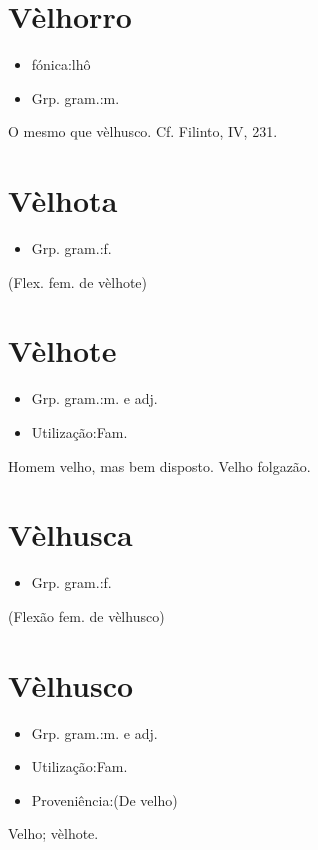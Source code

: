 \documentclass{article}
\begin{document}
\section{Vèlhorro}
\begin{itemize}
\item {fónica:lhô}
\end{itemize}
\begin{itemize}
\item {Grp. gram.:m.}
\end{itemize}
O mesmo que \textunderscore vèlhusco\textunderscore . Cf. Filinto, IV, 231.
\section{Vèlhota}
\begin{itemize}
\item {Grp. gram.:f.}
\end{itemize}
(Flex. fem. de \textunderscore vèlhote\textunderscore )
\section{Vèlhote}
\begin{itemize}
\item {Grp. gram.:m.  e  adj.}
\end{itemize}
\begin{itemize}
\item {Utilização:Fam.}
\end{itemize}
Homem velho, mas bem disposto.
Velho folgazão.
\section{Vèlhusca}
\begin{itemize}
\item {Grp. gram.:f.}
\end{itemize}
(Flexão fem. de \textunderscore vèlhusco\textunderscore )
\section{Vèlhusco}
\begin{itemize}
\item {Grp. gram.:m.  e  adj.}
\end{itemize}
\begin{itemize}
\item {Utilização:Fam.}
\end{itemize}
\begin{itemize}
\item {Proveniência:(De \textunderscore velho\textunderscore )}
\end{itemize}
Velho; vèlhote.
\end{document}
